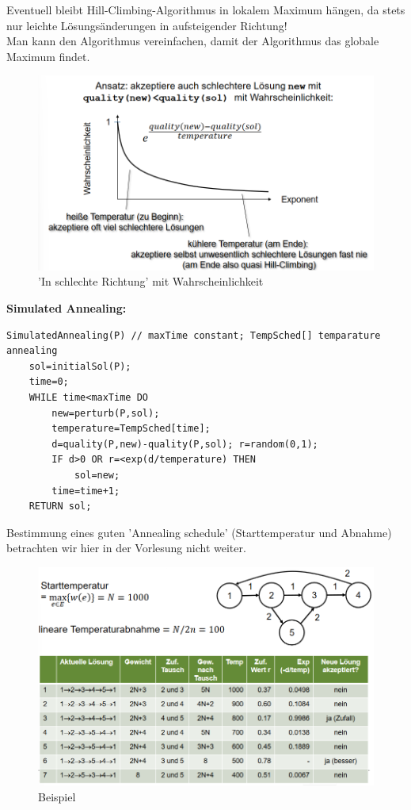 \documentclass{article}
\begin{document}
            Eventuell bleibt Hill-Climbing-Algorithmus in lokalem Maximum hängen, da stets nur leichte Lösungsänderungen in aufsteigender Richtung!\\
            Man kann den Algorithmus vereinfachen, damit der Algorithmus das globale Maximum findet.\\
            \begin{figure}[ht]
                \centering
                \includegraphics[width=1\textwidth]{Bilder/InSchlechteRichtung.png}
                \caption{'In schlechte Richtung' mit Wahrscheinlichkeit}
                \label{fig:InSchlechteRichtung}
            \end{figure}
            \newpage
            \textbf{Simulated Annealing:}
            \begin{lstlisting}[style=pseudocode]
SimulatedAnnealing(P) // maxTime constant; TempSched[] temparature annealing
    sol=initialSol(P);
    time=0;
    WHILE time<maxTime DO
        new=perturb(P,sol);
        temperature=TempSched[time];
        d=quality(P,new)-quality(P,sol); r=random(0,1);
        IF d>0 OR r=<exp(d/temperature) THEN
            sol=new;
        time=time+1;
    RETURN sol;
            \end{lstlisting}
            Bestimmung eines guten 'Annealing schedule' (Starttemperatur und Abnahme) betrachten wir hier in der Vorlesung nicht weiter.\\
            \begin{figure}[ht]
                \centering
                \includegraphics[width=1\textwidth]{Bilder/SimAn.png}
                \caption{Beispiel}
                \label{fig:SimAn}
            \end{figure}
\end{document}
